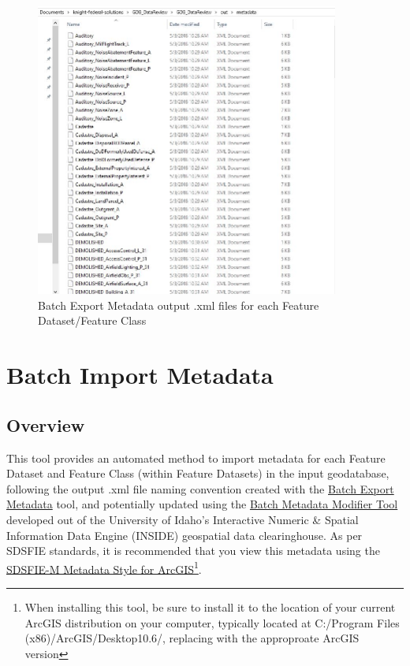 \documentclass[openany]{book}
\let\rmarkdownfootnote\footnote%
\def\footnote{\protect\rmarkdownfootnote}
\theoremstyle{definition}
\theoremstyle{definition}
\theoremstyle{definition}
\theoremstyle{remark}
\begin{document}
\begin{figure}[H]

{\centering \includegraphics[width=3.93in,]{figures/exMeta-after} 

}

\caption{Batch Export Metadata output .xml files for each Feature Dataset/Feature Class}\label{fig:exMetaafter}
\end{figure}

\hypertarget{imMeta}{\chapter{Batch Import Metadata}\label{imMeta}}

\section{Overview}\label{overview-11}

This tool provides an automated method to import metadata for each
Feature Dataset and Feature Class (within Feature Datasets) in the input
geodatabase, following the output .xml file naming convention created
with the \protect\hyperlink{exMeta}{Batch Export Metadata} tool, and
potentially updated using the
\href{http://insideidaho.org/helpdocs/batch_metadata_modifier_tool.html}{Batch
Metadata Modifier Tool} developed out of the University of Idaho's
Interactive Numeric \& Spatial Information Data Engine (INSIDE)
geospatial data clearinghouse. As per SDSFIE standards, it is
recommended that you view this metadata using the
\href{https://www.sdsfieonline.org/Standards/Metadata}{SDSFIE-M Metadata
Style for ArcGIS}\footnote{When installing this tool, be sure to install
  it to the location of your current ArcGIS distribution on your
  computer, typically located at C:/Program Files
  (x86)/ArcGIS/Desktop10.6/, replacing with the approproate ArcGIS
  version}.
\end{document}
